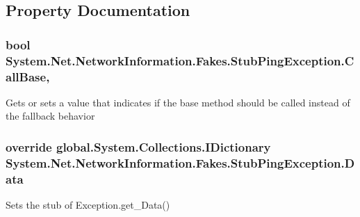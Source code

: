 \subsection{Property Documentation}
\hypertarget{class_system_1_1_net_1_1_network_information_1_1_fakes_1_1_stub_ping_exception_a54287c31144e14108f21e551a5337fae}{
\subsubsection[{Call\-Base}]{\setlength{\rightskip}{0pt plus 5cm}bool System.\-Net.\-Network\-Information.\-Fakes.\-Stub\-Ping\-Exception.\-Call\-Base\hspace{0.3cm}{\ttfamily [get]}, {\ttfamily [set]}}}\label{class_system_1_1_net_1_1_network_information_1_1_fakes_1_1_stub_ping_exception_a54287c31144e14108f21e551a5337fae}


Gets or sets a value that indicates if the base method should be called instead of the fallback behavior

\hypertarget{class_system_1_1_net_1_1_network_information_1_1_fakes_1_1_stub_ping_exception_a1386cdaef34ab95c91775e2bc5690888}{
\subsubsection[{Data}]{\setlength{\rightskip}{0pt plus 5cm}override global.\-System.\-Collections.\-I\-Dictionary System.\-Net.\-Network\-Information.\-Fakes.\-Stub\-Ping\-Exception.\-Data\hspace{0.3cm}{\ttfamily [get]}}}\label{class_system_1_1_net_1_1_network_information_1_1_fakes_1_1_stub_ping_exception_a1386cdaef34ab95c91775e2bc5690888}


Sets the stub of Exception.\-get\-\_\-\-Data()


